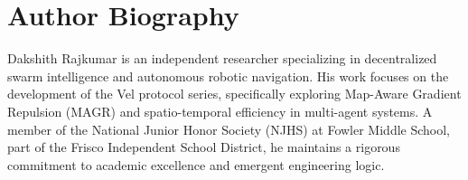\documentclass[letterpaper, 10pt, conference]{IEEEtran}
\begin{document}
\section*{Author Biography}
\vspace{-7ex} 

\begin{IEEEbiographynophoto}{Dakshith Rajkumar}
is an independent researcher specializing in decentralized swarm intelligence and autonomous robotic navigation. His work focuses on the development of the Vel protocol series, specifically exploring Map-Aware Gradient Repulsion (MAGR) and spatio-temporal efficiency in multi-agent systems. A member of the National Junior Honor Society (NJHS) at Fowler Middle School, part of the Frisco Independent School District, he maintains a rigorous commitment to academic excellence and emergent engineering logic.
\end{IEEEbiographynophoto}

\vfill %
\end{document}
